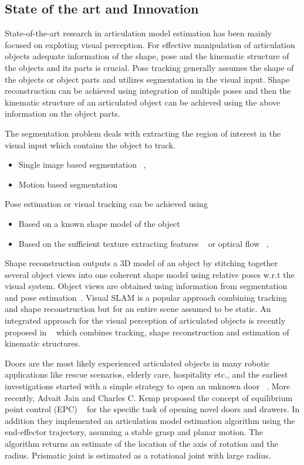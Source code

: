 \documentclass[12pt,a4paper]{report}
\begin{document}
\subsection{State of the art and Innovation}
State-of-the-art research in articulation model estimation has been mainly focused on exploting visual perception. For effective manipulation of articulation objects adequate information of the shape, pose and the kinematic structure of the objects and its parts is crucial. Pose tracking generally assumes the shape of the objects or object parts and utilizes segmentation in the visual input. Shape reconstruction can be achieved using integration of multiple poses and then the kinematic structure of an articulated object can be achieved using the above information on the object parts.

The segmentation problem deals with extracting the region of interest in the visual input which contains the object to track. 
\begin{itemize}
	\item Single image based segmentation ~\cite{mishra2009active},~\cite{papon2013voxel}
	\item Motion based segmentation ~\cite{chien2002efficient}
\end{itemize}

Pose estimation or visual tracking can be achieved using
\begin{itemize}
	\item Based on a known shape model of the object ~\cite{wuthrich2013probabilistic}
	\item Based on the sufficient texture extracting features ~\cite{martin2014online} or optical flow ~\cite{stuckler2013efficient},~\cite{ochs2014segmentation}
\end{itemize} 

Shape reconstruction outputs a 3D model of an object by stitching together several object views into one coherent shape model using relative poses w.r.t the visual system. Object views are obtained using information from segmentation and pose estimation~\cite{krainin2011manipulator}. Visual SLAM is a popular approach combining tracking and shape reconstruction but for an entire scene assumed to be static. An integrated approach for the visual perception of articulated objects is recently proposed in ~\cite{martinintegrated} which combines tracking, shape reconstruction and estimation of kinematic structures. 

Doors are the most likely experienced articulated objects in many robotic applications like rescue scenarios, elderly care, hospitality etc., and the earliest investigations started with a simple strategy to open an unknown door ~\cite{niemeyer1997simple}. More recently, Advait Jain and Charles C. Kemp proposed the concept of equilibrium point control (EPC) ~\cite{jain2009pulling} for the specific task of opening novel doors and drawers. In addition they implemented an articulation model estimation algorithm using the end-effector trajectory, assuming a stable grasp and planar motion. The algorithm returns an estimate of the location of the axis of rotation and the radius. Prismatic joint is estimated as a rotational joint with large radius. 
\end{document}
